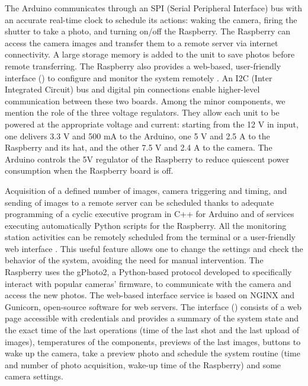 The Arduino communicates through an SPI (Serial Peripheral Interface) bus with an
accurate real-time clock to schedule its actions: waking the camera, firing the shutter to take a photo, and turning on/off the Raspberry. 
The Raspberry can access the camera images and transfer them to a remote server via internet connectivity. 
A large storage memory is added to the unit to save photos before remote transferring. 
The Raspberry also provides a web-based, user-friendly interface
() to configure and monitor the system remotely
\citep{greig}.
An I2C (Inter Integrated Circuit) bus and digital pin connections enable higher-level
communication between these two boards. Among the minor components, we mention the role
of the three voltage regulators. They allow each unit to be powered at the appropriate
voltage and current: starting from the 12 V in input, one delivers 3.3 V and 500 mA to
the Arduino, one 5 V and 2.5 A to the Raspberry and its hat, and the other 7.5 V and 2.4
A to the camera. The Arduino controls the 5V regulator of the Raspberry to reduce
quiescent power consumption when the Raspberry board is off.

Acquisition of a defined number of images, camera triggering and timing, and sending of
images to a remote server can be scheduled thanks to adequate programming of a cyclic
executive program in C++ for Arduino and  of services executing automatically Python
scripts for the Raspberry.
All the monitoring station activities can be remotely scheduled from the terminal or a
user-friendly web interface \citep{greig}. 
This useful feature allows one to change the settings and check the behavior of the system, avoiding the need for manual intervention. 
The Raspberry uses the gPhoto2, a Python-based protocol developed to specifically interact with popular cameras’ firmware, to communicate with the camera and access the new photos. 
The  web-based interface service is based on NGINX and Gunicorn, open-source software for web servers. 
The interface () consists of a web page accessible with credentials and provides a summary of the system state and the exact time of the last operations (time of the last shot and the last upload of images), temperatures of the components, previews of the last images, buttons to wake up the camera, take a preview photo and schedule the system routine (time and number of photo acquisition, wake-up time of the Raspberry) and some camera settings.

